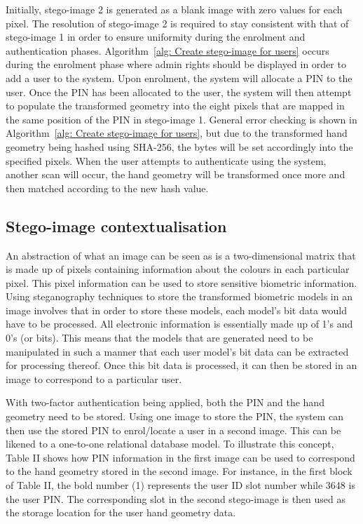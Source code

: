 
Initially, stego-image 2 is generated as a blank image with zero values for each pixel. The resolution of stego-image 2 is required to stay consistent with that of stego-image 1 in order to ensure uniformity during the enrolment and authentication phases. Algorithm~\ref{alg: Create stego-image for users} occurs during the enrolment phase where admin rights should be displayed in order to add a user to the system. Upon enrolment, the system will allocate a PIN to the user. Once the PIN has been allocated to the user, the system will then attempt to populate the transformed geometry into the eight pixels that are mapped in the same position of the PIN in stego-image 1. General error checking is shown in Algorithm~\ref{alg: Create stego-image for users}, but due to the transformed hand geometry being hashed using SHA-256, the bytes will be set accordingly into the specified pixels. When the user attempts to authenticate using the system, another scan will occur, the hand geometry will be transformed once more and then matched according to the new hash value.

\subsection{Stego-image contextualisation}

An abstraction of what an image can be seen as is a two-dimensional matrix that is made up of pixels containing information about the colours in each particular pixel. This pixel information can be used to store sensitive biometric information. Using steganography techniques to store the transformed biometric models in an image involves that in order to store these models, each model's bit data would have to be processed. All electronic information is essentially made up of 1’s and 0’s (or bits). This means that the models that are generated need to be manipulated in such a manner that each user model’s bit data can be extracted for processing thereof. Once this bit data is processed, it can then be stored in an image to correspond to a particular user. 

With two-factor authentication being applied, both the PIN and the hand geometry need to be stored. Using one image to store the PIN, the system can then use the stored PIN to enrol/locate a user in a second image. This can be likened to a one-to-one relational database model. To illustrate this concept, Table II shows how PIN information in the first image can be used to correspond to the hand geometry stored in the second image. For instance, in the first block of Table II, the bold number (1) represents the user ID slot number while 3648 is the user PIN. The corresponding slot in the second stego-image is then used as the storage location for the user hand geometry data.

